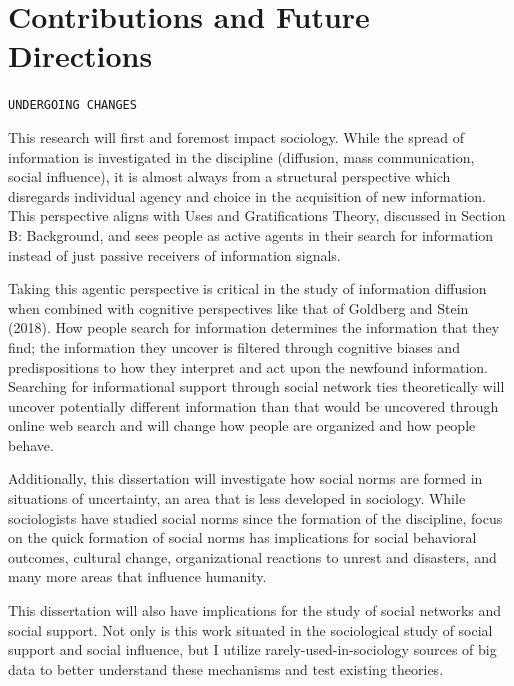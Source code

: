 \section{Contributions and Future Directions}
\begin{center}
    \texttt{UNDERGOING CHANGES}
\end{center}


This research will first and foremost impact sociology. While the spread
of information is investigated in the discipline (diffusion, mass
communication, social influence), it is almost always from a structural
perspective which disregards individual agency and choice in the
acquisition of new information. This perspective aligns with Uses and
Gratifications Theory, discussed in Section B: Background, and sees
people as active agents in their search for information instead of just
passive receivers of information signals.

Taking this agentic perspective is critical in the study of information
diffusion when combined with cognitive perspectives like that of
Goldberg and Stein (2018). How people search for information determines
the information that they find; the information they uncover is filtered
through cognitive biases and predispositions to how they interpret and
act upon the newfound information. Searching for informational support
through social network ties theoretically will uncover potentially
different information than that would be uncovered through online web
search and will change how people are organized and how people behave.

Additionally, this dissertation will investigate how social norms are
formed in situations of uncertainty, an area that is less developed in
sociology. While sociologists have studied social norms since the
formation of the discipline, focus on the quick formation of social
norms has implications for social behavioral outcomes, cultural change,
organizational reactions to unrest and disasters, and many more areas
that influence humanity.

This dissertation will also have implications for the study of social
networks and social support. Not only is this work situated in the
sociological study of social support and social influence, but I utilize
rarely-used-in-sociology sources of big data to better understand these
mechanisms and test existing theories.

